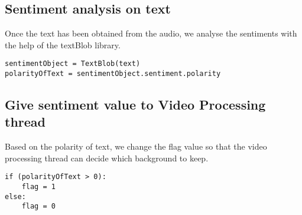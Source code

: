 \subsection{Sentiment analysis on text}
Once the text has been obtained from the audio, we analyse the sentiments with the help of the textBlob library.
\begin{lstlisting}[breaklines]
sentimentObject = TextBlob(text)
polarityOfText = sentimentObject.sentiment.polarity
\end{lstlisting}
\subsection{Give sentiment value to Video Processing thread}
Based on the polarity of text, we change the flag value so that the video processing thread can decide which background to keep.
\begin{lstlisting}[breaklines]
if (polarityOfText > 0):
	flag = 1
else:
	flag = 0
\end{lstlisting}

